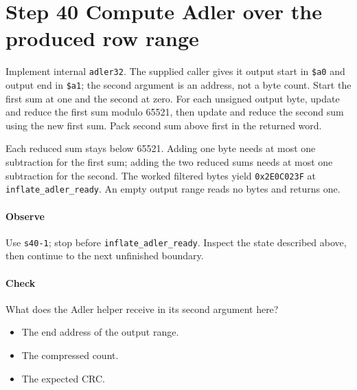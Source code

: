 \section{Step 40 Compute Adler over the produced row range}\label{png-inflate-s40}
Implement internal \texttt{adler32}. The supplied caller gives it output start in \texttt{\$a0} and output end in \texttt{\$a1}; the second argument is an address, not a byte count. Start the first sum at one and the second at zero. For each unsigned output byte, update and reduce the first sum modulo 65521, then update and reduce the second sum using the new first sum. Pack second sum above first in the returned word.

Each reduced sum stays below 65521. Adding one byte needs at most one subtraction for the first sum; adding the two reduced sums needs at most one subtraction for the second. The worked filtered bytes yield \texttt{0x2E0C023F} at \texttt{inflate\_adler\_ready}. An empty output range reads no bytes and returns one.

\paragraph{Observe} Use \texttt{s40-1}; stop before \texttt{inflate\_adler\_ready}. Inspect the state described above, then continue to the next unfinished boundary.

\paragraph{Check} What does the Adler helper receive in its second argument here?
\begin{itemize}
\item[A.] The end address of the output range.
\item[B.] The compressed count.
\item[C.] The expected CRC.
\end{itemize}
